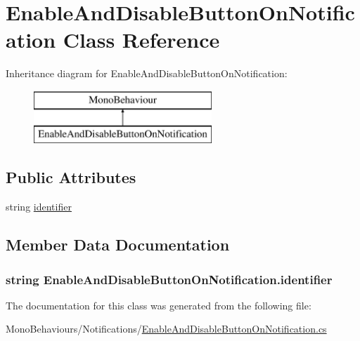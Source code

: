\hypertarget{class_enable_and_disable_button_on_notification}{}\section{Enable\+And\+Disable\+Button\+On\+Notification Class Reference}
\label{class_enable_and_disable_button_on_notification}
Inheritance diagram for Enable\+And\+Disable\+Button\+On\+Notification\+:\begin{figure}[H]
\begin{center}
\leavevmode
\includegraphics[height=2.000000cm]{class_enable_and_disable_button_on_notification}
\end{center}
\end{figure}
\subsection*{Public Attributes}
\begin{DoxyCompactItemize}
\item 
string \hyperlink{class_enable_and_disable_button_on_notification_a459b1865194e816747daf47f78449736}{identifier}
\end{DoxyCompactItemize}


\subsection{Member Data Documentation}
\subsubsection[{\texorpdfstring{identifier}{identifier}}]{\setlength{\rightskip}{0pt plus 5cm}string Enable\+And\+Disable\+Button\+On\+Notification.\+identifier}\hypertarget{class_enable_and_disable_button_on_notification_a459b1865194e816747daf47f78449736}{}\label{class_enable_and_disable_button_on_notification_a459b1865194e816747daf47f78449736}


The documentation for this class was generated from the following file\+:\begin{DoxyCompactItemize}
\item 
Mono\+Behaviours/\+Notifications/\hyperlink{_enable_and_disable_button_on_notification_8cs}{Enable\+And\+Disable\+Button\+On\+Notification.\+cs}\end{DoxyCompactItemize}
